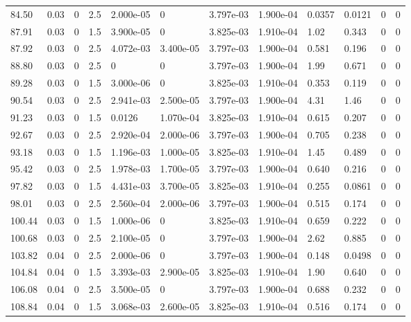 \documentclass[preview]{standalone}
\begin{document}
{{{\begin{tabular}{L{1.2cm}C{1.2cm} C{0.3cm}C{0.5cm} C{1.4cm}C{1.4cm} C{1.4cm}C{1.4cm} C{1.6cm}C{1.6cm} C{1.6cm}C{1.6cm}}
  84.50  &  0.03  & 0     & 2.5 &  2.000e-05  & 0  &  3.797e-03&   1.900e-04& 0.0357 & 0.0121   &  0 & 0  \\ 
  87.91  &  0.03  & 0     & 1.5 &  3.900e-05  & 0  &  3.825e-03&   1.910e-04& 1.02 & 0.343   &  0 & 0  \\ 
  87.92  &  0.03  & 0     & 2.5 &  4.072e-03  & 3.400e-05  &  3.797e-03&   1.900e-04& 0.581 & 0.196   &  0 & 0  \\ 
  88.80  &  0.03  & 0     & 2.5 &  0  & 0  &  3.797e-03&   1.900e-04& 1.99 & 0.671   &  0 & 0  \\ 
  89.28  &  0.03  & 0     & 1.5 &  3.000e-06  & 0  &  3.825e-03&   1.910e-04& 0.353 & 0.119   &  0 & 0  \\ 
  90.54  &  0.03  & 0     & 2.5 &  2.941e-03  & 2.500e-05  &  3.797e-03&   1.900e-04& 4.31 & 1.46   &  0 & 0  \\ 
  91.23  &  0.03  & 0     & 1.5 &  0.0126  & 1.070e-04  &  3.825e-03&   1.910e-04& 0.615 & 0.207   &  0 & 0  \\ 
  92.67  &  0.03  & 0     & 2.5 &  2.920e-04  & 2.000e-06  &  3.797e-03&   1.900e-04& 0.705 & 0.238   &  0 & 0  \\ 
  93.18  &  0.03  & 0     & 1.5 &  1.196e-03  & 1.000e-05  &  3.825e-03&   1.910e-04& 1.45 & 0.489   &  0 & 0  \\ 
  95.42  &  0.03  & 0     & 2.5 &  1.978e-03  & 1.700e-05  &  3.797e-03&   1.900e-04& 0.640 & 0.216   &  0 & 0  \\ 
  97.82  &  0.03  & 0     & 1.5 &  4.431e-03  & 3.700e-05  &  3.825e-03&   1.910e-04& 0.255 & 0.0861   &  0 & 0  \\ 
  98.01  &  0.03  & 0     & 2.5 &  2.560e-04  & 2.000e-06  &  3.797e-03&   1.900e-04& 0.515 & 0.174   &  0 & 0  \\ 
  100.44  &  0.03  & 0     & 1.5 &  1.000e-06  & 0  &  3.825e-03&   1.910e-04& 0.659 & 0.222   &  0 & 0  \\ 
  100.68  &  0.03  & 0     & 2.5 &  2.100e-05  & 0  &  3.797e-03&   1.900e-04& 2.62 & 0.885   &  0 & 0  \\ 
  103.82  &  0.04  & 0     & 2.5 &  2.000e-06  & 0  &  3.797e-03&   1.900e-04& 0.148 & 0.0498   &  0 & 0  \\ 
  104.84  &  0.04  & 0     & 1.5 &  3.393e-03  & 2.900e-05  &  3.825e-03&   1.910e-04& 1.90 & 0.640   &  0 & 0  \\ 
  106.08  &  0.04  & 0     & 2.5 &  3.500e-05  & 0  &  3.797e-03&   1.900e-04& 0.688 & 0.232   &  0 & 0  \\ 
  108.84  &  0.04  & 0     & 1.5 &  3.068e-03  & 2.600e-05  &  3.825e-03&   1.910e-04& 0.516 & 0.174   &  0 & 0  \\ 

\end{tabular}}}}
\end{document}
